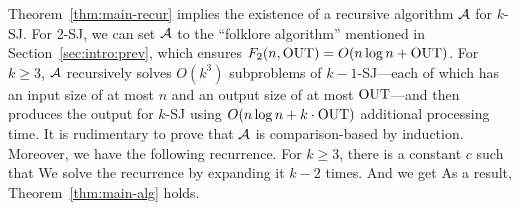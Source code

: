 
Theorem~\ref{thm:main-recur} implies the existence of a recursive algorithm $\mathcal{A}$ for $k$-SJ. For 2-SJ, we can set $\mathcal{A}$ to the ``folklore algorithm'' mentioned in Section~\ref{sec:intro:prev}, which ensures $F_2(n, \mathrm{OUT}) = O(n \log n + \mathrm{OUT})$. For $k \geq 3$, $\mathcal{A}$ recursively solves $O(k^3)$ subproblems of $k-1$-SJ---each of which has an input size of at most $n$ and an output size of at most $\mathrm{OUT}$---and then produces the output for $k$-SJ using $O(n\log n + k\cdot \mathrm{OUT})$ additional processing
time. It is rudimentary to prove that $\mathcal{A}$ is comparison-based by induction.
Moreover, we have the following recurrence.
For $k \geq 3$, there is a constant $c$ such that
We solve the recurrence by expanding it $k-2$ times. And we get
As a result, Theorem~\ref{thm:main-alg} holds. 